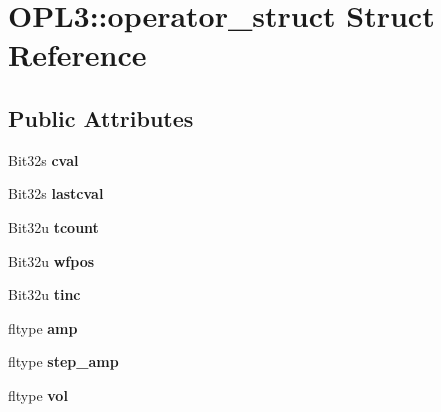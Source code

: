 \hypertarget{structOPL3_1_1operator__struct}{\section{O\-P\-L3\-:\-:operator\-\_\-struct Struct Reference}
\label{structOPL3_1_1operator__struct}
}
\subsection*{Public Attributes}
\begin{DoxyCompactItemize}
\item 
\hypertarget{structOPL3_1_1operator__struct_a8766b110ff8e1753895ad50258f5acc3}{Bit32s {\bfseries cval}}\label{structOPL3_1_1operator__struct_a8766b110ff8e1753895ad50258f5acc3}

\item 
\hypertarget{structOPL3_1_1operator__struct_af64685ee5ad08a7425da2f2d9f31d35f}{Bit32s {\bfseries lastcval}}\label{structOPL3_1_1operator__struct_af64685ee5ad08a7425da2f2d9f31d35f}

\item 
\hypertarget{structOPL3_1_1operator__struct_a4f118cbe631b6c978460be1f7640a928}{Bit32u {\bfseries tcount}}\label{structOPL3_1_1operator__struct_a4f118cbe631b6c978460be1f7640a928}

\item 
\hypertarget{structOPL3_1_1operator__struct_a8939243f75bb43a1a53a2f16511f741d}{Bit32u {\bfseries wfpos}}\label{structOPL3_1_1operator__struct_a8939243f75bb43a1a53a2f16511f741d}

\item 
\hypertarget{structOPL3_1_1operator__struct_a837ab8f0fbb1f0fe10b41d155d4053b1}{Bit32u {\bfseries tinc}}\label{structOPL3_1_1operator__struct_a837ab8f0fbb1f0fe10b41d155d4053b1}

\item 
\hypertarget{structOPL3_1_1operator__struct_ad12c80506bd768bce83e9898f16036cb}{fltype {\bfseries amp}}\label{structOPL3_1_1operator__struct_ad12c80506bd768bce83e9898f16036cb}

\item 
\hypertarget{structOPL3_1_1operator__struct_aac34e3a9bcbc30c33256503985495641}{fltype {\bfseries step\-\_\-amp}}\label{structOPL3_1_1operator__struct_aac34e3a9bcbc30c33256503985495641}

\item 
\hypertarget{structOPL3_1_1operator__struct_a7757216c8521a59770c9b093d8587705}{fltype {\bfseries vol}}\label{structOPL3_1_1operator__struct_a7757216c8521a59770c9b093d8587705}


\end{DoxyCompactItemize}

